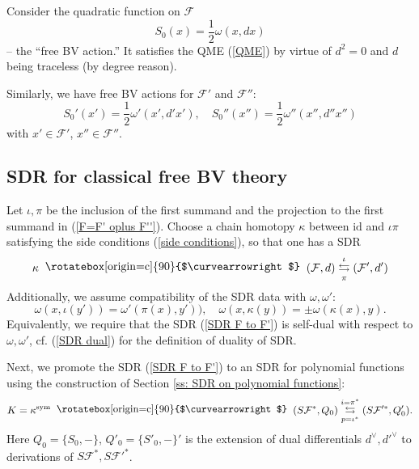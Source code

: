 \documentclass{amsart}
\theoremstyle{plain} %
\theoremstyle{definition}
\theoremstyle{remark}
\newcommand{\mr}{\mathrm}
\newcommand{\F}{\mathcal{F}}
\newcommand{\SDR}[5]{#5\;\;\raisebox{1.3pt}{\rotatebox[origin=c]{90}{$\curvearrowright$}}\;\; #1 \underset{#4}{\stackrel{#3}{\leftrightarrows}} #2}  %
\begin{document}
Consider the quadratic function on $\F$
\begin{equation}
    S_0(x)=\frac12\omega(x,dx)  
\end{equation}
-- the ``free BV action.'' It satisfies the QME (\ref{QME}) by virtue of $d^2=0$ and $d$ being traceless (by degree reason).

Similarly, we have free BV actions for $\F'$ and $\F''$: 
\begin{equation}
S_0'(x')=\frac12\omega'(x',d'x'),\quad S_0''(x'')=\frac12 \omega''(x'',d'' x'')
\end{equation}
with $x'\in \F'$, $x''\in \F''$.


\subsection{SDR for classical free BV theory}
Let $\iota,\pi$ be the inclusion of the first summand and the projection to the first summand in (\ref{F=F' oplus F''}). Choose a chain homotopy $\kappa$ between $\mr{id}$ and $\iota\pi$ satisfying the side conditions (\ref{side conditions}), so that one has a SDR
\begin{equation}\label{SDR F to F'}
    \SDR{(\F,d)}{(\F',d')}{\iota}{\pi}{\kappa}
\end{equation}
Additionally, we assume compatibility of the SDR data with $\omega,\omega'$: 
\begin{equation}\label{SDR self-duality condition}
    \omega(x,\iota(y'))=\omega'(\pi(x),y')),\quad \omega(x,\kappa(y))=\pm \omega(\kappa(x),y).
\end{equation}
Equivalently, we require that the SDR (\ref{SDR F to F'}) is self-dual with respect to $\omega,\omega'$, cf. (\ref{SDR dual}) for the definition of duality of SDR.

Next, we promote the SDR (\ref{SDR F to F'}) to an SDR for polynomial functions using the construction of Section \ref{ss: SDR on polynomial functions}:
\begin{equation}\label{SDR of classical free BV theory}
    \SDR{(S\F^*,Q_0)}{(S\F'^*,Q'_0)}{i=\pi^*}{p=\iota^*}{K=\kappa^\mr{sym}}.
\end{equation}
Here $Q_0=\{S_0,-\}$, $Q'_0=\{S'_0,-\}'$ is the extension of dual differentials $d^\vee, d'^\vee$ to derivations of $S\F^*,S\F'^*$.
\end{document}
